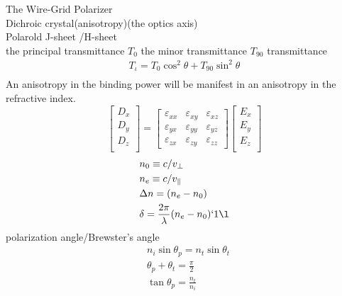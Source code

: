 \documentclass[fleqn,leqno]{article}
\begin{document}
	The Wire-Grid Polarizer\\
	Dichroic crystal(anisotropy)(the optics axis)\\
	Polarold J-sheet /H-sheet\\
	the principal transmittance $T_{0}$ the minor transmittance $T_{90}$
	transmittance
	\begin{equation*}
		\begin{split}
		T_{\iota}=T_{0}\cos^2{\theta}+T_{90}\sin^2{\theta}\\
		\end{split}
	\end{equation*}
	An anisotropy in the binding power will be manifest in an anisotropy in the refractive index.
	\begin{equation*}
		\begin{bmatrix}
			D_{x}\\
			D_{y}\\
			D_{z}\\
		\end{bmatrix}
	=
		\begin{bmatrix}
			\varepsilon_{xx}&\varepsilon_{xy}&\varepsilon_{xz}\\
			\varepsilon_{yx}&\varepsilon_{yy}&\varepsilon_{yz}\\
			\varepsilon_{zx}&\varepsilon_{zy}&\varepsilon_{zz}
		\end{bmatrix}
		\begin{bmatrix}
			E_{x}\\
			E_{y}\\
			E_{z}\\
		\end{bmatrix}
	\end{equation*}
	\begin{equation*}
		\begin{split}
			&n_{0}\equiv c/v_{\perp}\\
			&n_{e}\equiv c/v_{\parallel}\\
			&\Delta n=(n_{e}-n_{0})\\	
			&\delta=\frac{2\pi}{\lambda}(n_{e}-n_{0})`1\l	
		\end{split}
	\end{equation*}
	polarization angle/Brewster's angle
	\begin{equation*}
		\begin{split}
			&n_{i}\sin\theta_{p}=n_{t}\sin\theta_{t}\\
			&\theta_{p}+\theta_{t}=\frac{\pi}{2}\\
			&\tan\theta_{p}=\frac{n_{t}}{n_{i}}
		\end{split}
	\end{equation*}
\end{document}
